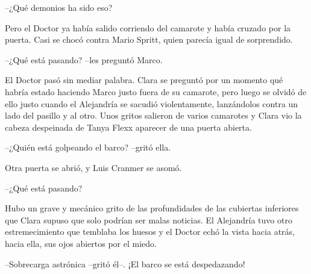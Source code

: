 {--¿Qué demonios ha sido eso?}

{Pero el Doctor ya había salido corriendo del camarote y había cruzado
 por la puerta. Casi se chocó contra Mario Spritt, quien parecía igual de
sorprendido.}

{--¿Qué está pasando? --les preguntó Marco.}

{El Doctor pasó sin mediar palabra. Clara se preguntó por un momento qué
 habría estado haciendo Marco justo fuera de su camarote, pero luego se
 olvidó de ello justo cuando el Alejandría se sacudió violentamente,
 lanzándolos contra un lado del pasillo y al otro. Unos gritos salieron
 de varios camarotes y Clara vio la cabeza despeinada de Tanya Flexx
aparecer de una puerta abierta.}

{--¿Quién está golpeando el barco? --gritó ella.}

{Otra puerta se abrió, y Luis Cranmer se asomó.}

{--¿Qué está pasando?}

{Hubo un grave y mecánico grito de las profundidades de las cubiertas
 inferiores que Clara supuso que solo podrían ser malas noticias. El
 Alejandría tuvo otro estremecimiento que temblaba los huesos y el Doctor
echó la vista hacia atrás, hacia ella, sus ojos abiertos por el miedo.}

{--Sobrecarga astrónica --gritó él--. ¡El barco se está despedazando!}
